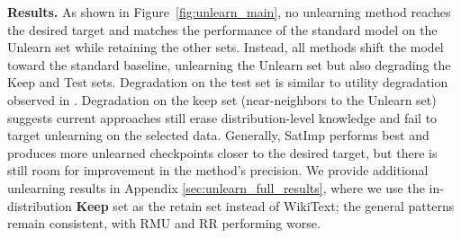 \textbf{Results.} As shown in Figure~\ref{fig:unlearn_main}, no unlearning method reaches the desired target and matches the performance of the standard model on the Unlearn set while retaining the other sets. Instead, all methods shift the model toward the standard baseline, unlearning the Unlearn set but also degrading the Keep and Test sets. Degradation on the test set is similar to utility degradation observed in \citet{muse}. Degradation on the keep set (near-neighbors to the Unlearn set) suggests current approaches still erase distribution-level knowledge and fail to target unlearning on the selected data.  Generally, SatImp performs best and produces more unlearned checkpoints closer to the desired target, but there is still room for improvement in the method's precision. We provide additional unlearning results in Appendix \ref{sec:unlearn_full_results}, where we use the in-distribution \textbf{Keep} set as the retain set instead of WikiText; the general patterns remain consistent, with RMU and RR performing worse. 







